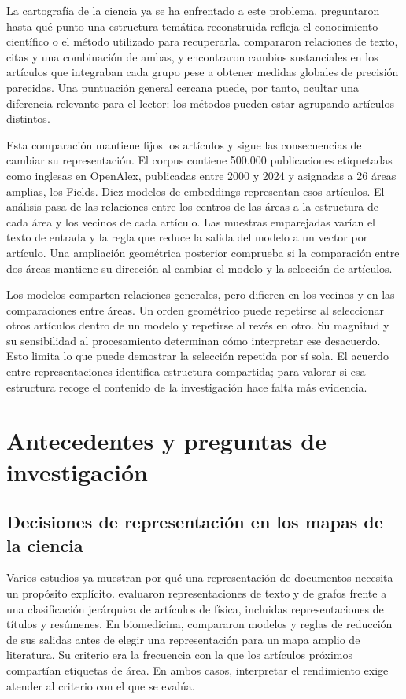 \documentclass[12pt]{article}
\begin{document}
La cartografía de la ciencia ya se ha enfrentado a este problema. \citet{refa0d2d707e6} preguntaron hasta qué punto una estructura temática reconstruida refleja el conocimiento científico o el método utilizado para recuperarla. \citet{ref6a2f5912bc} compararon relaciones de texto, citas y una combinación de ambas, y encontraron cambios sustanciales en los artículos que integraban cada grupo pese a obtener medidas globales de precisión parecidas. Una puntuación general cercana puede, por tanto, ocultar una diferencia relevante para el lector: los métodos pueden estar agrupando artículos distintos.

Esta comparación mantiene fijos los artículos y sigue las consecuencias de cambiar su representación. El corpus contiene 500.000 publicaciones etiquetadas como inglesas en OpenAlex, publicadas entre 2000 y 2024 y asignadas a 26 áreas amplias, los Fields. Diez modelos de embeddings representan esos artículos. El análisis pasa de las relaciones entre los centros de las áreas a la estructura de cada área y los vecinos de cada artículo. Las muestras emparejadas varían el texto de entrada y la regla que reduce la salida del modelo a un vector por artículo. Una ampliación geométrica posterior comprueba si la comparación entre dos áreas mantiene su dirección al cambiar el modelo y la selección de artículos.

Los modelos comparten relaciones generales, pero difieren en los vecinos y en las comparaciones entre áreas. Un orden geométrico puede repetirse al seleccionar otros artículos dentro de un modelo y repetirse al revés en otro. Su magnitud y su sensibilidad al procesamiento determinan cómo interpretar ese desacuerdo. Esto limita lo que puede demostrar la selección repetida por sí sola. El acuerdo entre representaciones identifica estructura compartida; para valorar si esa estructura recoge el contenido de la investigación hace falta más evidencia.

\section{Antecedentes y preguntas de investigación}
\subsection{Decisiones de representación en los mapas de la ciencia}
Varios estudios ya muestran por qué una representación de documentos necesita un propósito explícito. \citet{refc0e2cc29e0} evaluaron representaciones de texto y de grafos frente a una clasificación jerárquica de artículos de física, incluidas representaciones de títulos y resúmenes. En biomedicina, \citet{refbe130e2973} compararon modelos y reglas de reducción de sus salidas antes de elegir una representación para un mapa amplio de literatura. Su criterio era la frecuencia con la que los artículos próximos compartían etiquetas de área. En ambos casos, interpretar el rendimiento exige atender al criterio con el que se evalúa.
\end{document}
